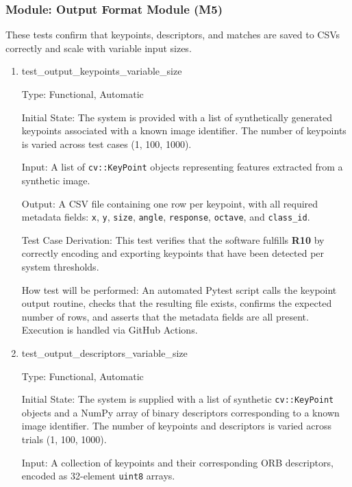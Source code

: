 \documentclass[12pt, titlepage]{article}
\begin{document}
\subsubsection{Module: Output Format Module (M5)}

These tests confirm that keypoints, descriptors, and matches are saved to CSVs correctly and scale with variable input sizes.

\begin{enumerate}
  \item{test\_output\_keypoints\_variable\_size\\}

  Type: Functional, Automatic
  
  Initial State: The system is provided with a list of synthetically generated keypoints associated with a known image identifier. The number of keypoints is varied across test cases (1, 100, 1000).
  
  Input: A list of \texttt{cv::KeyPoint} objects representing features extracted from a synthetic image.
  
  Output: A CSV file containing one row per keypoint, with all required metadata fields: \texttt{x}, \texttt{y}, \texttt{size}, \texttt{angle}, \texttt{response}, \texttt{octave}, and \texttt{class\_id}.
  
  Test Case Derivation: This test verifies that the software fulfills \textbf{R10} by correctly encoding and exporting keypoints that have been detected per system thresholds.
  
  How test will be performed: An automated Pytest script calls the keypoint output routine, checks that the resulting file exists, confirms the expected number of rows, and asserts that the metadata fields are all present. Execution is handled via GitHub Actions.
 


  \item{test\_output\_descriptors\_variable\_size\\}

  Type: Functional, Automatic
  
  Initial State: The system is supplied with a list of synthetic \texttt{cv::KeyPoint} objects and a NumPy array of binary descriptors corresponding to a known image identifier. The number of keypoints and descriptors is varied across trials (1, 100, 1000).
  
  Input: A collection of keypoints and their corresponding ORB descriptors, encoded as 32-element \texttt{uint8} arrays.
  

\end{enumerate}
\end{document}
